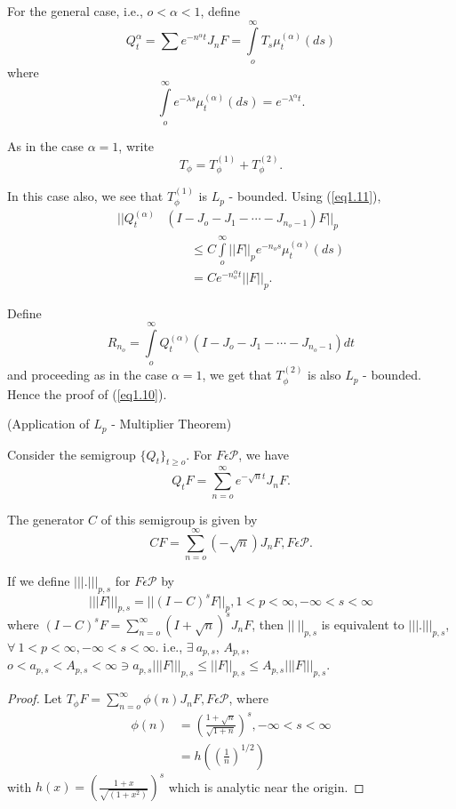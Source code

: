 For the general case, i.e., $o < \alpha < 1$, define
$$
Q^\alpha_t = \sum e^{-n^\alpha t} J_n F = \int\limits_o^\infty T_s \mu_t^{(\alpha)} (ds)
$$
where
$$
\int\limits_{o}^{\infty} e^{-\lambda s} \mu_t^{(\alpha)} (ds) = e^{- \lambda^\alpha t}.
$$

As in the case $\alpha = 1$, write
$$
T_\phi = T_\phi^{(1)} + T_\phi^{(2)}.
$$

In this case also, we see that $T_\phi^{(1)}$ is $L_p$ -
bounded. Using (\ref{eq1.11}), 
\begin{align*}
  || Q_t^{(\alpha)} & (I - J_o - J_1 - \cdots - J_{n_o -1}) F ||_p\\
  & \qquad \le C \int\limits_{o}^{\infty} || F ||_p e^{-n_o s}
  \mu_t^{(\alpha)} (ds)\\ 
  & \qquad = C e^{-n_o^\alpha t} || F ||_p. 
\end{align*}

Define\pageoriginale
$$
R_{n_o} = \int\limits_o^\infty Q_t^{(\alpha)} (I - J_o - J_1 - \cdots
- J_{n_o -1}) dt 
$$
and proceeding as in the case $\alpha = 1$, we get that $T_\phi^{(2)}$
is also $L_p$ - bounded. Hence the proof of (\ref{eq1.10}). 

\begin{remark*}
  (Application of $L_p$ - Multiplier Theorem)
\end{remark*}

Consider the semigroup $\{ Q_t \}_{t \ge o}$. For $F \epsilon 
\mathcal{P}$, we have 
$$
Q_t F = \sum_{n = o}^{\infty} e^{- \sqrt{n} t} J_n F.
$$

The generator $C$ of this semigroup is given by 
$$
CF = \sum_{n = o}^{\infty} (- \sqrt{n}) J_n F, F \epsilon  \mathcal{P}.
$$

If we define $||| . |||_{p, s} $ for $F \epsilon  \mathcal{P}$ by
$$
||| F |||_{p, s} = || (I - C)^s F ||_{\dot{p}}, 1< p < \infty, -
\infty < s < \infty 
$$
where $(I - C)^s F = \sum_{n = o}^{\infty} (I + \sqrt{n})^s J_n F$,
then $|| ~ ||_{p, s}$ is equivalent to $||| . |||_{p, s}$, $\forall~ 1
< p < \infty, -\infty < s < \infty$. i.e., $\exists ~ a_{p, s }$, 
$A_{p, s }$, $o < a_{p, s} < A_{p, s} < \infty \ni a_{p, s} ||| F |||_{p,
  s} \le || F ||_{p, s} \le A_{p, s} ||| F |||_{p, s}$. 

\begin{proof}
  Let $T_\phi F = \sum\limits_{n = o}^{\infty} \phi (n) J_n F, F
  \epsilon  \mathcal{P}$, where 
  \begin{align*}
    \phi (n) & = \left(\frac{1+ \surd n}{\sqrt{1 + n}}\right)^s, - \infty
    < s < \infty \\ 
    & = h \left(\left(\frac{1}{n}\right)^{1/2}\right)
  \end{align*}
  with  $h(x)  = \left(\frac{1 + x}{\sqrt{(1 + x^2)}}\right)^s$  which
  is analytic near the origin. 
\end{proof}

